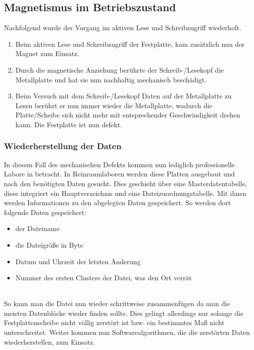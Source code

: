 \documentclass[10pt,a4paper]{article} %
\begin{document}
\subsection{Magnetismus im Betriebszustand}
Nachfolgend wurde der Vorgang im aktiven Lese und Schreibzugriff wiederholt.
\begin{enumerate}
\item Beim aktiven Lese und Schreibzugriff der Festplatte, kam zusätzlich nun der Magnet zum Einsatz.
\item Durch die magnetische Anziehung berührte der Schreib-/Lesekopf die Metallplatte und hat sie nun nachhaltig mechanisch beschädigt.
\item Beim Versuch mit dem Schreib-/Lesekopf Daten auf der Metallplatte zu Lesen berührt er nun immer wieder die Metallplatte, wodurch die Platte/Scheibe sich nicht mehr mit entsprechender Geschwindigkeit drehen kann. Die Festplatte ist nun defekt.
\end{enumerate}
\newpage
\subsubsection{Wiederherstellung der Daten}
In diesem Fall des mechanischen Defekts kommen nun lediglich professionelle Labore in betracht. In Reinraumlaboren werden diese Platten ausgebaut und nach den benötigten Daten gesucht. Dies geschieht über eine Masterdatentabelle, diese integriert ein Hauptverzeichnis und eine Dateizuordnungstabelle. Mit ihnen werden Informationen zu den abgelegten Daten gespeichert. So werden dort folgende Daten gespeichert:
\begin{itemize}
\item  \glqq der Dateiname\grqq{}
\item  \glqq die Dateigröße in Byte\grqq{}
\item  \glqq Datum und Uhrzeit der letzten Änderung\grqq{}
\item  \glqq Nummer des ersten Clusters der Datei\grqq{}, was den Ort verrät
\end{itemize}
\cite{Reinraum}\\
So kann man die Datei nun wieder schrittweise zusammenfügen da man die meisten Datenblöcke wieder finden sollte. Dies gelingt allerdings nur solange die Festplattenscheibe nicht völlig zerstört ist bzw. ein bestimmtes Maß nicht unterschreitet. Weiter kommen nun Softwarealgorithmen, die die zerstörten Daten wiederherstellen, zum Einsatz. \cite{Reinraum}
\end{document}
